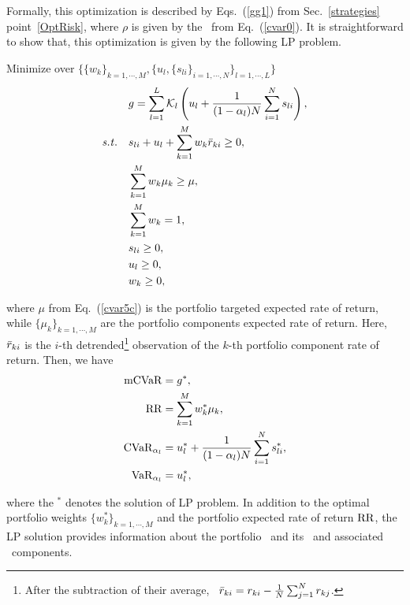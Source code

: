 Formally, this optimization is described by Eqs.~(\ref{gg1}) from Sec.~\ref{strategies} point~\ref{OptRisk},
where $\rho$ is given by the \mCVaR\ from Eq.\ (\ref{cvar0}).
It is straightforward to show that, this optimization is given by the following LP problem.

\bigskip
\noindent Minimize over $\{\{w_k\}_{k=1,\cdots,M}, \{ u_l, \{s_{li}\}_{i=1,\cdots,N}\}_{l=1,\cdots,L}\}$
\begin{subequations}\label{cvar5}
\begin{align}
    &g = \sum_{l=1}^{L}\cK_l \left( u_l + \frac{1}{(1-\alpha_l)N} \sum_{i=1}^N s_{li} \right), \label{cvar5a} \\
    \st &s_{li} + u_l + \sum_{k=1}^M w_k \br_{ki} \geq 0, \label{cvar5b} \\
        &\sum_{k=1}^M w_k \mu_k \geq \mu, \label{cvar5c} \\
        &\sum_{k=1}^M w_k = 1, \label{cvar5d} \\
        & s_{li} \geq 0, \label{cvar5e} \\
        & u_l \geq 0, \label{cvar5f} \\
        & w_k \geq 0, \label{cvar5g}
\end{align}
\end{subequations}

\noindent where $\mu$ from Eq.~(\ref{cvar5c}) is the portfolio targeted expected rate of return, while $\{\mu_k\}_{k = 1,\cdots,M}$
are the portfolio components expected rate of return. Here, ${\bar r}_{ki}$ is the $i$-th detrended\footnote{After
the subtraction of their average, \ie\ ${\bar r}_{ki} = r_{ki} - \frac{1}{N}\sum_{j=1}^N r_{kj}$.} observation of the
$k$-th portfolio component rate of return.
Then, we have
\begin{subequations}\label{cvar6}
\begin{align}
    \mCVaR &= g^*, \label{cvar6a} \\
    \RR &= \sum_{k=1}^M w_k^* \mu_k, \label{cvar6b} \\
    \CVaR_{\alpha_l} &= u_l^* + \frac{1}{(1-\alpha_l)N} \sum_{i=1}^N s_{li}^*, \label{cvar6c} \\
    \VaR_{\alpha_l} &= u_l^*, \label{cvar6d}
\end{align}
\end{subequations}

\noindent where the $^*$ denotes the solution of LP problem.
In addition to the optimal portfolio weights $\{w_k^*\}_{k=1,\cdots,M}$
and the portfolio expected rate of return ${\rm RR}$,
the LP solution provides information about the portfolio \mCVaR\ and its  \CVaR\
and associated \VaR\ components.



